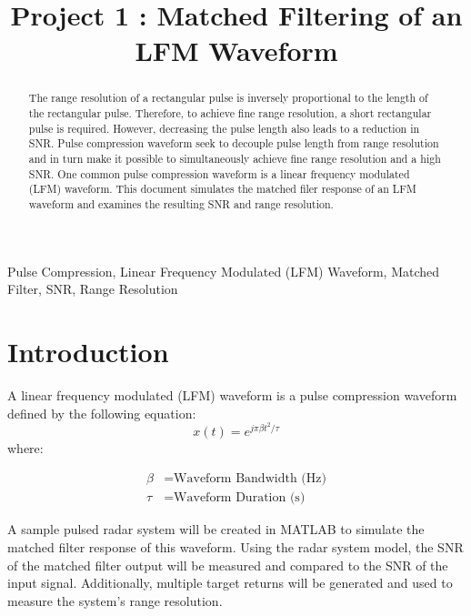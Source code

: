\documentclass[conference]{IEEEtran}
\begin{document}
\title{Project 1 : Matched Filtering of an LFM Waveform}

\author{
}
\maketitle

\begin{abstract}
The range resolution of a rectangular pulse is inversely proportional to the length of the rectangular pulse. Therefore, to achieve fine range resolution, a short rectangular pulse is required. However, decreasing the pulse length also leads to a reduction in SNR. Pulse compression waveform seek to decouple pulse length from range resolution and in turn make it possible to simultaneously achieve fine range resolution and a high SNR. One common pulse compression waveform is a linear frequency modulated (LFM) waveform. This document simulates the matched filer response of an LFM waveform and examines the resulting SNR and range resolution.
\end{abstract}

\begin{IEEEkeywords}
Pulse Compression, Linear Frequency Modulated (LFM) Waveform, Matched Filter, SNR, Range Resolution
\end{IEEEkeywords}
\section{Introduction}
A linear frequency modulated (LFM) waveform is a pulse compression waveform defined by the following equation:
\begin{equation}
x(t)=e^{j\pi\beta t^2/\tau}
\label{lfm_waveform}
\end{equation}
where:
\begin{fleqn}[\parindent]
\begin{align*}
\beta &= \text{Waveform Bandwidth (Hz)}\\
\tau &= \text{Waveform Duration (s)}
\end{align*}
\end{fleqn}
A sample pulsed radar system will be created in MATLAB to simulate the matched filter response of this waveform. Using the radar system model, the SNR of the matched filter output will be measured and compared to the SNR of the input signal. Additionally, multiple target returns will be generated and used to measure the system's range resolution.
\end{document}
